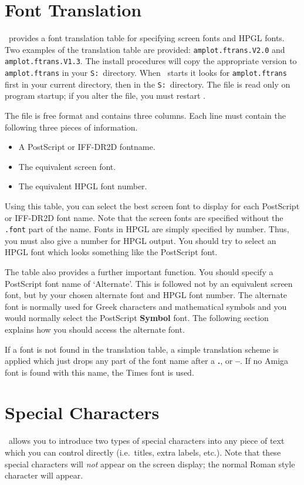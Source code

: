 \section{Font Translation}
\amplot\ provides a font translation table for specifying 
screen fonts and HPGL
fonts. Two examples of the translation table are provided: {\tt amplot.ftrans.V2.0} 
and {\tt amplot.ftrans.V1.3}. The install procedures will copy the appropriate 
version to {\tt amplot.ftrans} in your {\tt S:}\ directory. When \amplot\ starts it 
looks for {\tt amplot.ftrans} first in your current directory, then in the {\tt S:}\ 
directory. The file is read only on program startup; if you alter the file, you must 
restart \amplot.

The file is free format and contains three columns. Each line must contain the 
following three pieces of information.
\begin{itemize}
\item A PostScript or IFF-DR2D fontname.
\item The equivalent screen font.
\item The equivalent HPGL font number.
\end{itemize}
Using this table, you can select the best screen font to display for each PostScript 
or IFF-DR2D font name. Note that the screen fonts are specified without the 
{\tt .font} part of the name. Fonts in HPGL are simply specified by number. 
Thus, you must also give a number for HPGL output. You should try to select an HPGL 
font which looks something like the PostScript font.

The table also provides a further important function. You should specify a 
PostScript font name of `Alternate'. This is followed not by an equivalent screen 
font, but by your chosen alternate font and HPGL font number. The alternate font is 
normally used for Greek characters and mathematical symbols and you would normally 
select the PostScript {\bf Symbol} font. The following section explains how you 
should access the alternate font.

If a font is not found in the translation table, a simple translation scheme is 
applied which just drops any part of the font name after a {\bf .}, or {\bf --}.
If no Amiga font is found with this name, the Times font is used.


\section{Special Characters}
\amplot\ allows you to introduce two types of special 
characters into any piece of 
text which you can control directly (i.e.\ titles, extra labels, etc.). Note that 
these special characters will {\em not\/} appear on the screen display; the normal 
Roman style character will appear.

